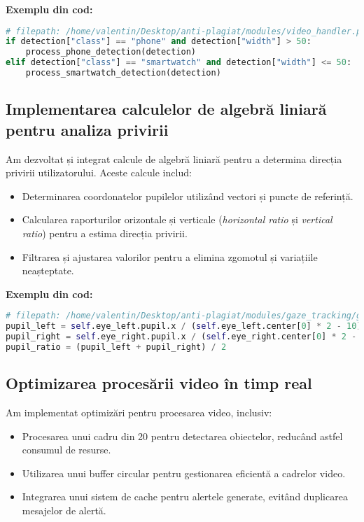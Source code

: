 \documentclass[12pt,a4paper]{article}
\begin{document}
\textbf{Exemplu din cod:}
\begin{lstlisting}[language=Python]
# filepath: /home/valentin/Desktop/anti-plagiat/modules/video_handler.py
if detection["class"] == "phone" and detection["width"] > 50:
    process_phone_detection(detection)
elif detection["class"] == "smartwatch" and detection["width"] <= 50:
    process_smartwatch_detection(detection)
\end{lstlisting}

\subsection{Implementarea calculelor de algebră liniară pentru analiza privirii}
Am dezvoltat și integrat calcule de algebră liniară pentru a determina direcția privirii utilizatorului. Aceste calcule includ:
\begin{itemize}
    \item Determinarea coordonatelor pupilelor utilizând vectori și puncte de referință.
    \item Calcularea raporturilor orizontale și verticale (\textit{horizontal ratio} și \textit{vertical ratio}) pentru a estima direcția privirii.
    \item Filtrarea și ajustarea valorilor pentru a elimina zgomotul și variațiile neașteptate.
\end{itemize}

\textbf{Exemplu din cod:}
\begin{lstlisting}[language=Python]
# filepath: /home/valentin/Desktop/anti-plagiat/modules/gaze_tracking/gaze_tracker.py
pupil_left = self.eye_left.pupil.x / (self.eye_left.center[0] * 2 - 10)
pupil_right = self.eye_right.pupil.x / (self.eye_right.center[0] * 2 - 10)
pupil_ratio = (pupil_left + pupil_right) / 2
\end{lstlisting}

\subsection{Optimizarea procesării video în timp real}
Am implementat optimizări pentru procesarea video, inclusiv:
\begin{itemize}
    \item Procesarea unui cadru din 20 pentru detectarea obiectelor, reducând astfel consumul de resurse.
    \item Utilizarea unui buffer circular pentru gestionarea eficientă a cadrelor video.
    \item Integrarea unui sistem de cache pentru alertele generate, evitând duplicarea mesajelor de alertă.
\end{itemize}
\end{document}
